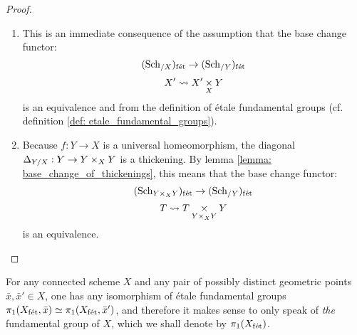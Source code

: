             \begin{proof}
                \noindent
                \begin{enumerate}
                    \item This is an immediate consequence of the assumption that the base change functor:
                        $$(\mathrm{Sch}_{/X})_{\mathrm{f\acute{e}t}} \to (\mathrm{Sch}_{/Y})_{\mathrm{f\acute{e}t}}$$
                        $$X' \mapsto X' \x_X Y$$
                    is an equivalence and from the definition of \'etale fundamental groups (cf. definition \ref{def: etale_fundamental_groups}).
                    \item Because $f: Y \to X$ is a universal homeomorphism, the diagonal $\Delta_{Y/X}: Y \to Y \x_X Y$ is a thickening. By lemma \ref{lemma: base_change_of_thickenings}, this means that the base change functor:
                        $$(\Sch_{Y \x_X Y})_{\fet} \to (\Sch_{/Y})_{\fet}$$
                        $$T \mapsto T \x_{Y \x_X Y} Y$$
                    is an equivalence.
                \end{enumerate}
            \end{proof}
        \begin{corollary} \label{coro: etale_fundamental_group_uniqueness}
            For any connected scheme $X$ and any pair of possibly distinct geometric points $\bar{x}, \bar{x}' \in X$, one has any isomorphism of \'etale fundamental groups $\pi_1(X_{\mathrm{f\acute{e}t}}, \bar{x}) \simeq \pi_1(X_{\mathrm{f\acute{e}t}}, \bar{x}')$, and therefore it makes sense to only speak of \textit{the} fundamental group of $X$, which we shall denote by $\pi_1(X_{\mathrm{f\acute{e}t}})$.
        \end{corollary}
        
